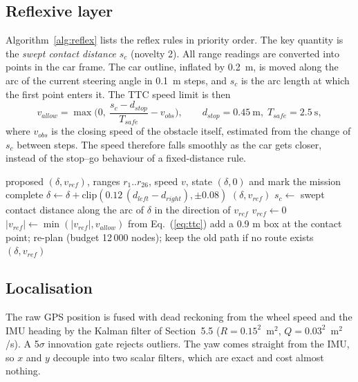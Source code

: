 \documentclass[12pt,a4paper]{article}
\begin{document}
\subsection{Reflexive layer}
Algorithm~\ref{alg:reflex} lists the reflex rules in priority order. The key quantity is the \emph{swept contact distance} $s_c$ (novelty 2). All range readings are converted into points in the car frame. The car outline, inflated by 0.2~m, is moved along the arc of the current steering angle in 0.1~m steps, and $s_c$ is the arc length at which the first point enters it. The TTC speed limit is then
\begin{equation}
v_{allow} = \max\!\Big(0,\ \frac{s_c - d_{stop}}{T_{safe}} - v_{obs}\Big), \qquad d_{stop} = 0.45~\text{m},\; T_{safe} = 2.5~\text{s},
\label{eq:ttc}
\end{equation}
where $v_{obs}$ is the closing speed of the obstacle itself, estimated from the change of $s_c$ between steps. The speed therefore falls smoothly as the car gets closer, instead of the stop--go behaviour of a fixed-distance rule.

\begin{algorithm}[H]
\caption{Reflex layer (runs every control step, after the procedural layer)}
\label{alg:reflex}
\begin{algorithmic}[1]
\Require proposed $(\delta, v_{ref})$, ranges $r_1..r_{26}$, speed $v$, state
 
    \Return $(\delta, 0)$ and mark the mission complete \EndIf
    $\delta \gets \delta + \text{clip}(0.12\,(d_{left} - d_{right}), \pm 0.08)$ \EndIf
   \State \Return $(\delta, v_{ref})$
\EndIf
\State $s_c \gets$ swept contact distance along the arc of $\delta$ in the direction of $v_{ref}$
 $v_{ref} \gets 0$ 
\Else\ $|v_{ref}| \gets \min(|v_{ref}|, v_{allow})$ from Eq.~(\ref{eq:ttc}) 
\EndIf
{} 
   \State add a 0.9 m box at the contact point; re-plan (budget 12\,000 nodes); keep the old path if no route exists
\EndIf
\State \Return $(\delta, v_{ref})$
\end{algorithmic}
\end{algorithm}

\subsection{Localisation}
The raw GPS position is fused with dead reckoning from the wheel speed and the IMU heading by the Kalman filter of Section~5.5 ($R = 0.15^2$~m$^2$, $Q = 0.03^2$~m$^2$/s). A 5$\sigma$ innovation gate rejects outliers. The yaw comes straight from the IMU, so $x$ and $y$ decouple into two scalar filters, which are exact and cost almost nothing.
\end{document}
